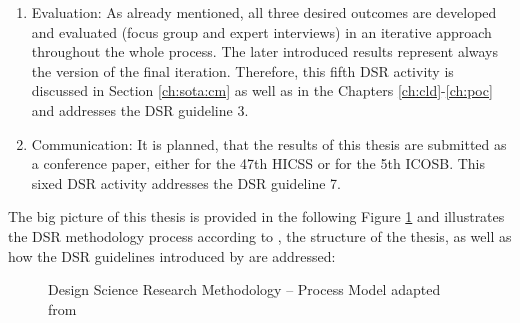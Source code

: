 \begin{enumerate}
	\item Evaluation: As already mentioned, all three desired outcomes are developed and evaluated (focus group and expert interviews) in an iterative approach throughout the whole process. The later introduced results represent always the version of the final iteration. Therefore, this fifth \ac{DSR} activity is discussed in Section \ref{ch:sota:cm} as well as in the Chapters \ref{ch:cld}-\ref{ch:poc} and addresses the \ac{DSR} guideline 3.
	\item Communication: It is planned, that the results of this thesis are submitted as a conference paper, either for the 47th \ac{HICSS} or for the 5th \ac{ICOSB}.  This sixed \ac{DSR} activity addresses the \ac{DSR} guideline 7.
\end{enumerate}

The big picture of this thesis is provided in the following Figure \ref{fig:dsrm} and illustrates the \ac{DSR} methodology process according to \citet{Peffers2007}, the structure of the thesis, as well as how the \ac{DSR} guidelines introduced by \citet{Hevner2004} are addressed:

\begin{figure}[tb]
	\centering
	
	\caption[Design Science Research Methodology -- Process Model]{Design Science Research Methodology -- Process Model adapted from \citet[p. 54]{Peffers2007}}
	\label{fig:dsrm}
\end{figure}
